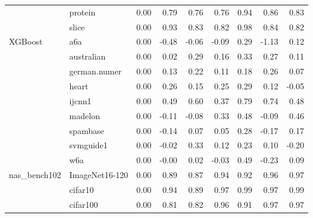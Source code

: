 \begin{tabular}{llrrrrrrr}
             & protein & 0.00 &        0.79 &           0.76 &           0.76 &                0.94 &                 0.86 &                 0.83 \\
             & slice & 0.00 &        0.93 &           0.83 &           0.82 &                0.98 &                 0.84 &                 0.82 \\
XGBoost & a6a & 0.00 &       -0.48 &          -0.06 &          -0.09 &                0.29 &                -1.13 &                 0.12 \\
             & australian & 0.00 &        0.02 &           0.29 &           0.16 &                0.33 &                 0.27 &                 0.11 \\
             & german.numer & 0.00 &        0.13 &           0.22 &           0.11 &                0.18 &                 0.26 &                 0.07 \\
             & heart & 0.00 &        0.26 &           0.15 &           0.25 &                0.29 &                 0.12 &                -0.05 \\
             & ijcnn1 & 0.00 &        0.49 &           0.60 &           0.37 &                0.79 &                 0.74 &                 0.48 \\
             & madelon & 0.00 &       -0.11 &          -0.08 &           0.33 &                0.48 &                -0.09 &                 0.46 \\
             & spambase & 0.00 &       -0.14 &           0.07 &           0.05 &                0.28 &                -0.17 &                 0.17 \\
             & svmguide1 & 0.00 &       -0.02 &           0.33 &           0.12 &                0.23 &                 0.10 &                -0.20 \\
             & w6a & 0.00 &       -0.00 &           0.02 &          -0.03 &                0.49 &                -0.23 &                 0.09 \\
nas\_bench102 & ImageNet16-120 & 0.00 &        0.89 &           0.87 &           0.94 &                0.92 &                 0.96 &                 0.97 \\
             & cifar10 & 0.00 &        0.94 &           0.89 &           0.97 &                0.99 &                 0.97 &                 0.99 \\
             & cifar100 & 0.00 &        0.81 &           0.82 &           0.96 &                0.91 &                 0.97 &                 0.97 \\
\bottomrule
\end{tabular}
